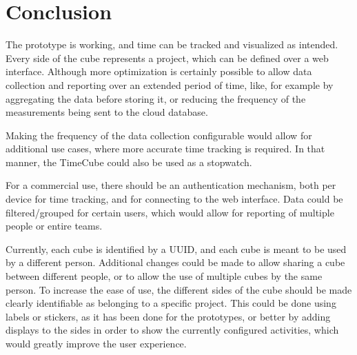 \section{Conclusion}

The prototype is working, and time can be tracked and visualized as intended. Every side of the cube represents a project, which can be defined over a web interface. Although more optimization is certainly possible to allow data collection and reporting over an extended period of time, like, for example by aggregating the data before storing it, or reducing the frequency of the measurements being sent to the cloud database.

Making the frequency  of the data collection configurable would allow for additional use cases, where more accurate time tracking is required. In that manner, the TimeCube could also be used as a stopwatch.

For a commercial use, there should be an authentication mechanism, both per device for time tracking, and for connecting to the  web interface. Data could be filtered/grouped for certain users, which would allow for reporting of multiple people or entire teams.

Currently, each cube is identified by a UUID, and each cube is meant to be used by a different person. Additional changes could be made to allow sharing a cube between different people, or to allow the use of multiple cubes by the same person. To increase the ease of use, the different sides of the cube should be made clearly identifiable as belonging to a specific project. This could be done using labels or stickers, as it has been done for the prototypes, or better by adding displays to the sides in order to show the currently configured activities, which would greatly improve the user experience.

\clearpage
